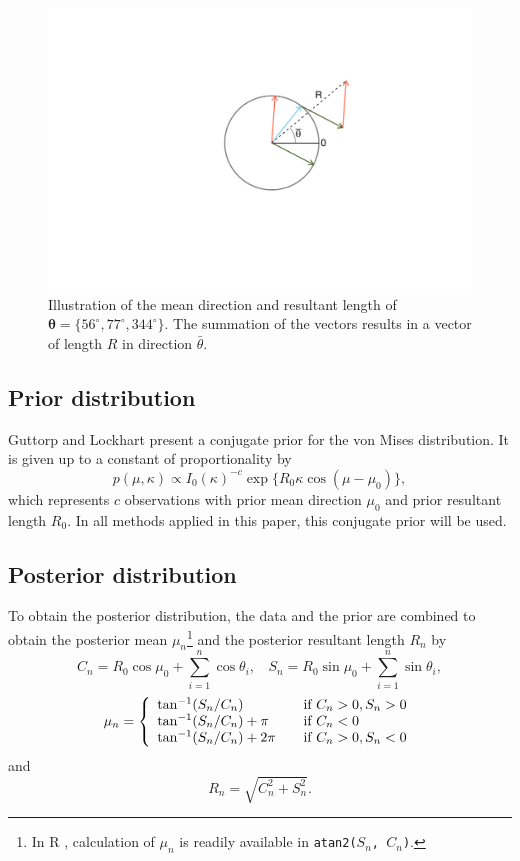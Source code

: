 \documentclass[]{gSCS2e}
\theoremstyle{plain}
\theoremstyle{definition}
\theoremstyle{remark}
\begin{document}
\begin{figure}
\centering
\includegraphics[width=0.7\linewidth, clip, trim=4cm 3cm 3cm 2cm]{ExampleRMu.pdf}
\caption{Illustration of the mean direction and resultant length of  $\boldsymbol\theta=\{56^\circ, 77^\circ, 344^\circ\}$. The summation of the vectors results in a vector of length $R$ in direction $\bar{\theta}$.}
\label{exampleRMu}
\end{figure}


\subsection{Prior distribution} \label{prior}

Guttorp and Lockhart \cite{guttorp1988finding} present a conjugate prior for the von Mises distribution. It is given up to a constant of proportionality by 
$$ p(\mu, \kappa) \propto  I_0 (\kappa) ^{-c} \exp\{R_0 \kappa \cos (\mu - \mu_0)\}  ,$$
which represents $c$ observations with prior mean direction $\mu_0$ and prior resultant length $R_0$. In all methods applied in this paper, this conjugate prior will be used. 

\subsection{Posterior distribution} \label{posterior}
To obtain the posterior distribution, the data and the prior are combined to obtain the posterior mean $\mu_n$\footnote{In  R \cite{team2013r}, calculation of $\mu_n$ is readily available in \texttt{atan2($S_n$, $C_n$)}.} and the posterior resultant length $R_n$ by
$$ C_n = R_0 \cos \mu_0 + \sum_{i=1}^n \cos \theta_i, ~~~~ S_n = R_0 \sin \mu_0 + \sum_{i=1}^n \sin \theta_i,$$
$$  \mu_n = \left\{ 
  \begin{array}{l l}
   \tan^{-1} (S_n/C_n)        & \quad \textnormal{if}~ \text{$C_n > 0, S_n > 0$}\\
   \tan^{-1} (S_n/C_n) + \pi  & \quad \textnormal{if}~ \text{$C_n < 0$}\\ 
   \tan^{-1} (S_n/C_n) + 2\pi & \quad \textnormal{if}~ \text{$C_n > 0, S_n < 0$}
  \end{array} \right.$$
and
$$ R_n = \sqrt{C_n^2 + S_n^2}.$$
\end{document}
